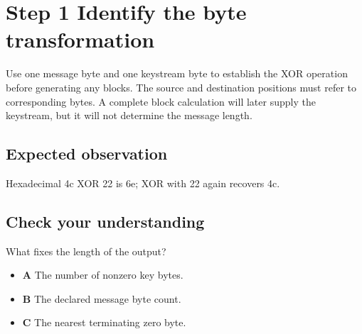 \section{Step 1 Identify the byte transformation}\label{chacha-s01}

Use one message byte and one keystream byte to establish the XOR operation before generating any blocks. The source and destination positions must refer to corresponding bytes. A complete block calculation will later supply the keystream, but it will not determine the message length.

\subsection{Expected observation}
Hexadecimal 4c XOR 22 is 6e; XOR with 22 again recovers 4c.

\subsection{Check your understanding}
What fixes the length of the output?

\begin{itemize}
\item \textbf{A} The number of nonzero key bytes.
\item \textbf{B} The declared message byte count.
\item \textbf{C} The nearest terminating zero byte.
\end{itemize}
